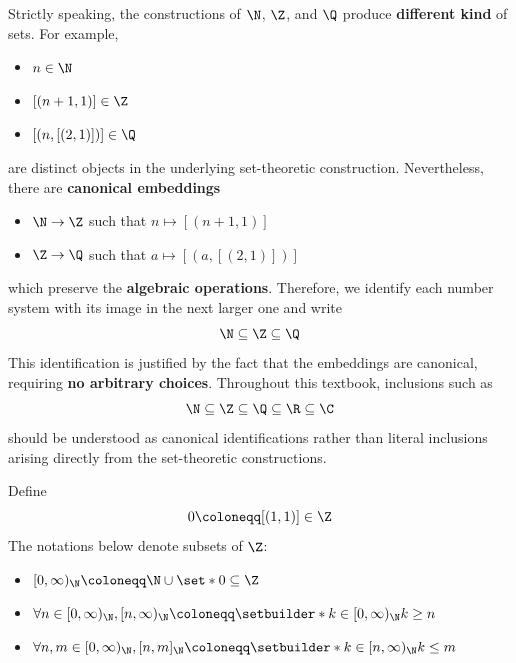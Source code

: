 \begin{remark}
  Strictly speaking, the constructions of $\N$, $\Z$, and $\Q$
  produce \textbf{different kind} of sets. For example,
  \begin{itemize}
    \item $n \in \N$
    \item $[(n + 1, 1)] \in \Z$
    \item $[(n, [(2, 1)])] \in \Q$
  \end{itemize}
  are distinct objects in the underlying set-theoretic construction.
  Nevertheless, there are \textbf{canonical embeddings}
  \begin{itemize}
    \item $\N \to \Z$ such that $n \mapsto [(n + 1, 1)]$
    \item $\Z \to \Q$ such that $a \mapsto [(a, [(2, 1)])]$
  \end{itemize}
  which preserve the \textbf{algebraic operations}. Therefore, we identify
  each number system with its image in the next larger one and write
  \[
    \N \subseteq \Z \subseteq \Q
  \]
  This identification is justified by the fact that the embeddings are canonical,
  requiring \textbf{no arbitrary choices}. Throughout this textbook, inclusions such as
  \[
    \N \subseteq \Z \subseteq \Q \subseteq \R \subseteq \C
  \]
  should be understood as canonical identifications rather than
  literal inclusions arising directly from the set-theoretic constructions.
\end{remark}

\begin{remark}
  Define
  \[
    0 \coloneqq [(1, 1)] \in \Z
  \]
  The notations below denote subsets of $\Z$:
  \begin{itemize}
    \item $[0, \infty)_{\N} \coloneqq \N \cup \set*{0} \subseteq \Z$
    \item $\forall n \in [0, \infty)_{\N}, [n, \infty)_{\N}
            \coloneqq \setbuilder*{k \in [0, \infty)_{\N}}{k \geq n}$
    \item $\forall n, m \in [0, \infty)_{\N}, [n, m]_{\N}
            \coloneqq \setbuilder*{k \in [n, \infty)_{\N}}{k \leq m}$
  \end{itemize}
\end{remark}
